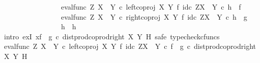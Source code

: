 \begin{isabellebody}
\ \ \ \ \ \ \ \ \ \ \ \ \ \ \ \ \ {\isacharparenleft}{\kern0pt}eval{\isacharunderscore}{\kern0pt}func\ Z\ {\isacharparenleft}{\kern0pt}X\ {\isasymCoprod}\ Y{\isacharparenright}{\kern0pt}\ {\isasymcirc}\isactrlsub c\ left{\isacharunderscore}{\kern0pt}coproj\ X\ Y\ {\isasymtimes}\isactrlsub f\ id\isactrlsub c\ {\isacharparenleft}{\kern0pt}Z\isactrlbsup {\isacharparenleft}{\kern0pt}X\ {\isasymCoprod}\ Y{\isacharparenright}{\kern0pt}\isactrlesup {\isacharparenright}{\kern0pt}{\isacharparenright}{\kern0pt}\isactrlsup {\isasymsharp}\ {\isasymcirc}\isactrlsub c\ h{}\ {\isacharequal}{\kern0pt}\ f\ {\isasymand}\isanewline
\ \ \ \ \ \ \ \ \ \ \ \ \ \ \ \ \ {\isacharparenleft}{\kern0pt}eval{\isacharunderscore}{\kern0pt}func\ Z\ {\isacharparenleft}{\kern0pt}X\ {\isasymCoprod}\ Y{\isacharparenright}{\kern0pt}\ {\isasymcirc}\isactrlsub c\ right{\isacharunderscore}{\kern0pt}coproj\ X\ Y\ {\isasymtimes}\isactrlsub f\ id\isactrlsub c\ {\isacharparenleft}{\kern0pt}Z\isactrlbsup {\isacharparenleft}{\kern0pt}X\ {\isasymCoprod}\ Y{\isacharparenright}{\kern0pt}\isactrlesup {\isacharparenright}{\kern0pt}{\isacharparenright}{\kern0pt}\isactrlsup {\isasymsharp}\ {\isasymcirc}\isactrlsub c\ h{}\ {\isacharequal}{\kern0pt}\ g\ {\isasymlongrightarrow}\isanewline
\ \ \ \ \ \ \ \ \ \ \ \ \ \ \ \ \ h{}\ {\isacharequal}{\kern0pt}\ h{\isacharparenright}{\kern0pt}{\isachardoublequoteclose}\isanewline
\ \ \ \ \isamarkupfalse%
\ {\isacharparenleft}{\kern0pt}intro\ exI{\isacharbrackleft}{\kern0pt}\ x{\isacharequal}{\kern0pt}{\isachardoublequoteopen}{\isacharparenleft}{\kern0pt}f\isactrlsup {\isasymflat}\ {\isasymamalg}\ g\isactrlsup {\isasymflat}\ {\isasymcirc}\isactrlsub c\ dist{\isacharunderscore}{\kern0pt}prod{\isacharunderscore}{\kern0pt}coprod{\isacharunderscore}{\kern0pt}right\ X\ Y\ H{\isacharparenright}{\kern0pt}\isactrlsup {\isasymsharp}{\isachardoublequoteclose}{\isacharbrackright}{\kern0pt}{\isacharcomma}{\kern0pt}\ safe{\isacharcomma}{\kern0pt}\ typecheck{\isacharunderscore}{\kern0pt}cfuncs{\isacharparenright}{\kern0pt}\isanewline
\ \ \ \ \ \ \isamarkupfalse%
\ {\isachardoublequoteopen}{\isacharparenleft}{\kern0pt}eval{\isacharunderscore}{\kern0pt}func\ Z\ {\isacharparenleft}{\kern0pt}X\ {\isasymCoprod}\ Y{\isacharparenright}{\kern0pt}\ {\isasymcirc}\isactrlsub c\ left{\isacharunderscore}{\kern0pt}coproj\ X\ Y\ {\isasymtimes}\isactrlsub f\ id\isactrlsub c\ {\isacharparenleft}{\kern0pt}Z\isactrlbsup {\isacharparenleft}{\kern0pt}X\ {\isasymCoprod}\ Y{\isacharparenright}{\kern0pt}\isactrlesup {\isacharparenright}{\kern0pt}{\isacharparenright}{\kern0pt}\isactrlsup {\isasymsharp}\ {\isasymcirc}\isactrlsub c\ {\isacharparenleft}{\kern0pt}f\isactrlsup {\isasymflat}\ {\isasymamalg}\ g\isactrlsup {\isasymflat}\ {\isasymcirc}\isactrlsub c\ dist{\isacharunderscore}{\kern0pt}prod{\isacharunderscore}{\kern0pt}coprod{\isacharunderscore}{\kern0pt}right\ X\ Y\ H{\isacharparenright}{\kern0pt}\isactrlsup {\isasymsharp}\ {\isacharequal}{\kern0pt}\ \isanewline

\end{isabellebody}
